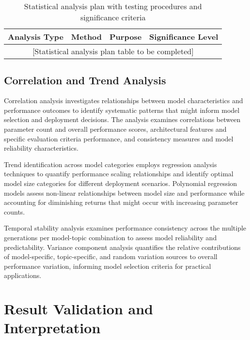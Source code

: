 \begin{table}[htbp]
    \centering
    \caption{Statistical analysis plan with testing procedures and significance criteria}
    \label{tab:statistical-analysis-plan}
    \begin{tabular}{|l|l|l|c|}
    \hline
    \textbf{Analysis Type} & \textbf{Method} & \textbf{Purpose} & \textbf{Significance Level} \\
    \hline
    \multicolumn{4}{|c|}{[Statistical analysis plan table to be completed]} \\
    \hline
    \end{tabular}
\end{table}

\subsection{Correlation and Trend Analysis}

Correlation analysis investigates relationships between model characteristics and performance outcomes to identify systematic patterns that might inform model selection and deployment decisions. The analysis examines correlations between parameter count and overall performance scores, architectural features and specific evaluation criteria performance, and consistency measures and model reliability characteristics.

Trend identification across model categories employs regression analysis techniques to quantify performance scaling relationships and identify optimal model size categories for different deployment scenarios. Polynomial regression models assess non-linear relationships between model size and performance while accounting for diminishing returns that might occur with increasing parameter counts.

Temporal stability analysis examines performance consistency across the multiple generations per model-topic combination to assess model reliability and predictability. Variance component analysis quantifies the relative contributions of model-specific, topic-specific, and random variation sources to overall performance variation, informing model selection criteria for practical applications.

\section{Result Validation and Interpretation}
\label{sec:result-validation}


